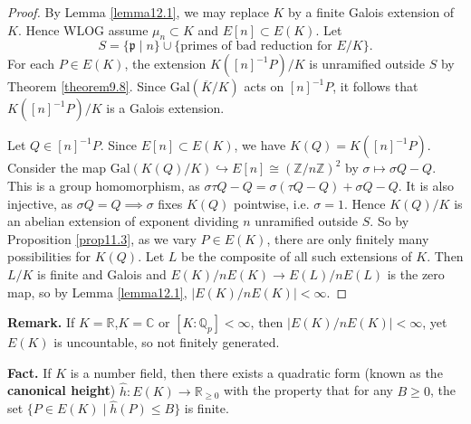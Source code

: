 \documentclass{article}
\theoremstyle{definition}
\begin{document}
\begin{proof}
    By Lemma \ref{lemma12.1}, we may replace $K$ by a finite Galois extension of $K$. Hence WLOG assume $\mu_n \subset K$ and $E[n] \subset E(K)$. Let $$S = \{\mathfrak{p} \mid  n\} \cup \{\text{primes of bad reduction for }E/K\}.$$ For each $P \in E(K)$, the extension $K([n]^{-1}P)/K$ is unramified outside $S$ by Theorem \ref{theorem9.8}. Since $\text{Gal}(\overline{K}/K)$ acts on $[n]^{-1}P$, it follows that $K([n]^{-1}P)/K$ is a Galois extension.
    \vspace{1mm}
     
    Let $Q \in [n]^{-1}P$. Since $E[n] \subset E(K)$, we have $K(Q) = K([n]^{-1}P)$. Consider the map $\text{Gal}(K(Q)/K) \hookrightarrow E[n] \cong (\mathbb{Z}/n\mathbb{Z})^2$ by $\sigma \mapsto \sigma Q-Q$. This is a group homomorphism, as $\sigma \tau Q - Q = \sigma(\tau Q - Q)+ \sigma Q - Q$. It is also injective, as $\sigma Q = Q \implies \sigma$ fixes $K(Q)$ pointwise, i.e. $\sigma=1$. Hence $K(Q)/K$ is an abelian extension of exponent dividing $n$ unramified outside $S$. So by Proposition \ref{prop11.3}, as we vary $P \in E(K)$, there are only finitely many possibilities for $K(Q)$. Let $L$ be the composite of all such extensions of $K$. Then $L/K$ is finite and Galois and $E(K)/nE(K) \to E(L)/nE(L)$ is the zero map, so by Lemma \ref{lemma12.1}, $\left|E(K)/nE(K)\right|<\infty$.
\end{proof}
\textbf{Remark.} If $K=\mathbb{R}$,$K = \mathbb{C}$ or $[K:\mathbb{Q}_p]<\infty$, then $\left|E(K)/nE(K)\right|<\infty$, yet $E(K)$ is uncountable, so not finitely generated.
\vspace{1mm}
 
\textbf{Fact.} If $K$ is a number field, then there exists a quadratic form (known as the \textbf{canonical height}) $\widehat{h}: E(K) \to \mathbb{R}_{\ge 0}$ with the property that for any $B\ge 0$, the set $\{P \in E(K) \mid \widehat{h}(P)\le B\}$ is finite.
\end{document}
